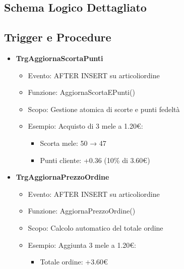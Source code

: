 \documentclass[a4paper,12pt]{article}
\begin{document}
\newpage
\subsection{Schema Logico Dettagliato}

\subsection{Trigger e Procedure}
\begin{tcolorbox}[enhanced,breakable,colback=mygray,colframe=myblue,title=Panoramica Trigger]
\begin{itemize}
    \item \textbf{TrgAggiornaScortaPunti}
        \begin{itemize}
            \item Evento: AFTER INSERT su articoliordine
            \item Funzione: AggiornaScortaEPunti()
            \item Scopo: Gestione atomica di scorte e punti fedeltà
            \item Esempio: Acquisto di 3 mele a 1.20€:
                \begin{itemize}
                    \item Scorta mele: 50 → 47
                    \item Punti cliente: +0.36 (10\% di 3.60€)
                \end{itemize}
        \end{itemize}
    
    \item \textbf{TrgAggiornaPrezzoOrdine}
        \begin{itemize}
            \item Evento: AFTER INSERT su articoliordine
            \item Funzione: AggiornaPrezzoOrdine()
            \item Scopo: Calcolo automatico del totale ordine
            \item Esempio: Aggiunta 3 mele a 1.20€:
                \begin{itemize}
                    \item Totale ordine: +3.60€
                \end{itemize}
        \end{itemize}
    

\end{itemize}
\end{tcolorbox}
\end{document}
